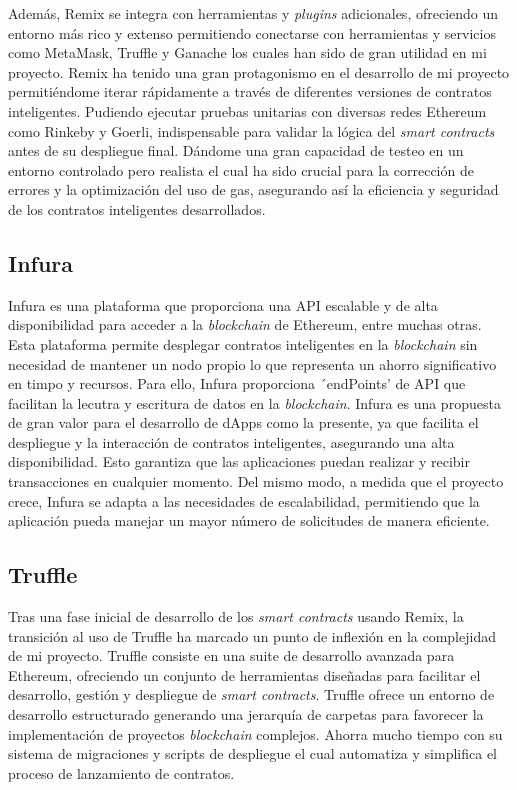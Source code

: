 Además, Remix se integra con herramientas y \textit{plugins} adicionales, ofreciendo un entorno más rico y extenso permitiendo conectarse con herramientas y servicios como MetaMask, Truffle y Ganache los cuales han sido de gran utilidad en mi proyecto.
Remix ha tenido una gran protagonismo en el desarrollo de mi proyecto permitiéndome iterar rápidamente a través de diferentes versiones de contratos inteligentes. Pudiendo ejecutar pruebas unitarias con diversas redes Ethereum como Rinkeby y Goerli, indispensable para validar la lógica del \textit{smart contracts} antes de su despliegue final. Dándome una gran capacidad de testeo en un entorno controlado pero realista el cual ha sido crucial para la corrección de errores y la optimización del uso de gas, asegurando así la eficiencia y seguridad de los contratos inteligentes desarrollados.


\subsection{Infura}

Infura es una plataforma que proporciona una API escalable y de alta disponibilidad para acceder a la \textit{blockchain} de Ethereum, entre muchas otras.
Esta plataforma permite desplegar contratos inteligentes en la \textit{blockchain} sin necesidad de mantener un nodo propio lo que representa un ahorro significativo en timpo y recursos.
Para ello, Infura proporciona ´endPoints' de API que facilitan la lecutra y escritura de datos en la \textit{blockchain}.
Infura es una propuesta de gran valor para el desarrollo de dApps como la presente, ya que facilita el despliegue y la interacción de contratos inteligentes, asegurando una alta disponibilidad. Esto garantiza que las aplicaciones puedan realizar y recibir transacciones en cualquier momento.
Del mismo modo, a medida que el proyecto crece, Infura se adapta a las necesidades de escalabilidad, permitiendo que la aplicación pueda manejar un mayor número de solicitudes de manera eficiente.


\subsection{Truffle}

Tras una fase inicial de desarrollo de los \textit{smart contracts} usando Remix, la transición al uso de Truffle ha marcado un punto de inflexión en la complejidad de mi proyecto.
Truffle consiste en una suite de desarrollo avanzada para Ethereum, ofreciendo un conjunto de herramientas diseñadas para facilitar el desarrollo, gestión y despliegue de \textit{smart contracts}.
Truffle ofrece un entorno de desarrollo estructurado generando una jerarquía de carpetas para favorecer la implementación de proyectos \textit{blockchain} complejos.
Ahorra mucho tiempo con su sistema de migraciones y scripts de despliegue el cual automatiza y simplifica el proceso de lanzamiento de contratos.

